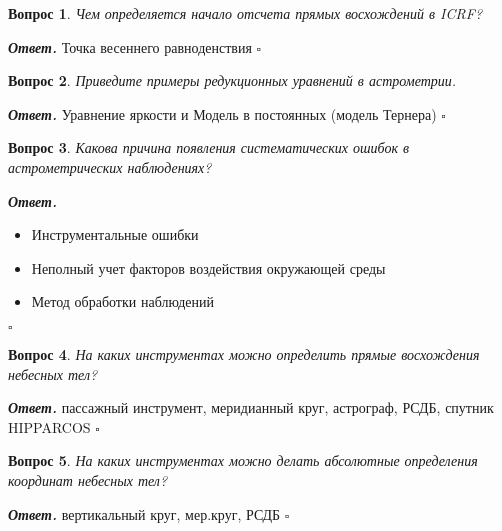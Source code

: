 \documentclass[12pt]{article}
\newtheorem{problem}{Вопрос}
\newenvironment{solution}[1][\it{Ответ}]{\textbf{#1. } }{$\square$}
\begin{document}
		\begin{problem}
			Чем определяется начало отсчета
			прямых восхождений в ICRF?
		\end{problem}
		
		\begin{solution}
			Точка весеннего равноденствия
		\end{solution}
		
		\begin{problem}
			Приведите примеры редукционных
			уравнений в астрометрии.
		\end{problem}
		
		\begin{solution}
			Уравнение яркости и Модель в постоянных (модель Тернера)		
		\end{solution}
		
		\begin{problem}
			Какова причина появления
			систематических ошибок в
			астрометрических
			наблюдениях?
		\end{problem}
		
		\begin{solution}
			
			\begin{itemize}
				\item Инструментальные ошибки
				\item  Неполный учет факторов воздействия окружающей среды
				\item  Метод обработки наблюдений
			\end{itemize}		
		\end{solution}
		
		\begin{problem}
			На каких инструментах можно
			определить прямые восхождения
			небесных тел? 
		\end{problem}
		
		\begin{solution}
			пассажный инструмент, меридианный
			круг, астрограф, РСДБ, спутник
			HIPPARCOS		
		\end{solution}
		
		\begin{problem}
			На каких инструментах можно
			делать абсолютные определения
			координат небесных тел? 
		\end{problem}
		
		\begin{solution}
			вертикальный круг,
			мер.круг, РСДБ		
		\end{solution}
		
\end{document}

